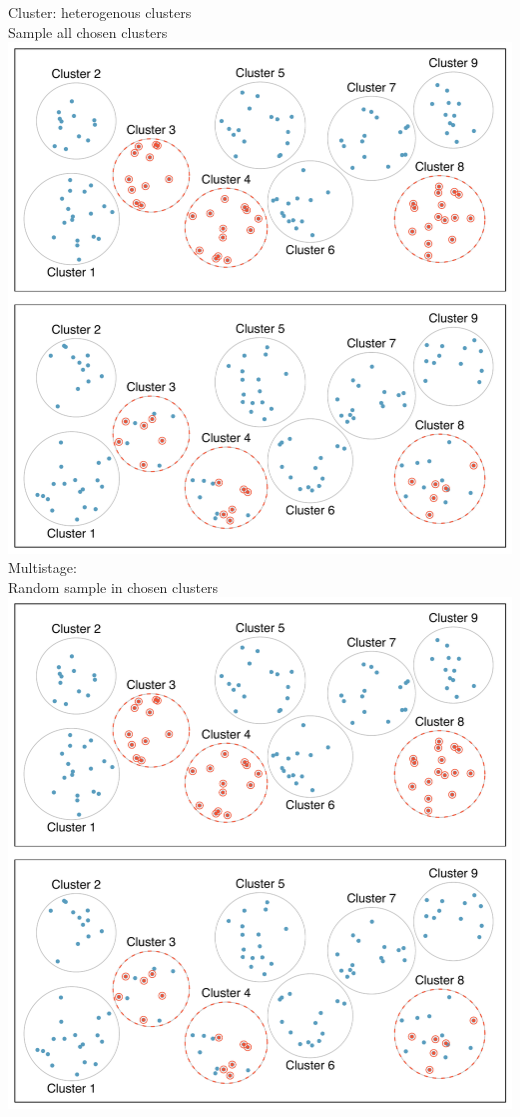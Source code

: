 \documentclass[11pt]{beamer}
\begin{document}
\begin{frame}
{}
{
\pause
\alert{Cluster:} {\small heterogenous clusters} \\
{\small Sample all chosen clusters}
\includegraphics[width=\textwidth]{figures/sampling_cluster} \\
\pause
\alert{Multistage:} \\
{\small Random sample in chosen clusters}
\includegraphics[width=\textwidth]{figures/sampling_multistage}
}

\end{frame}
\end{document}
